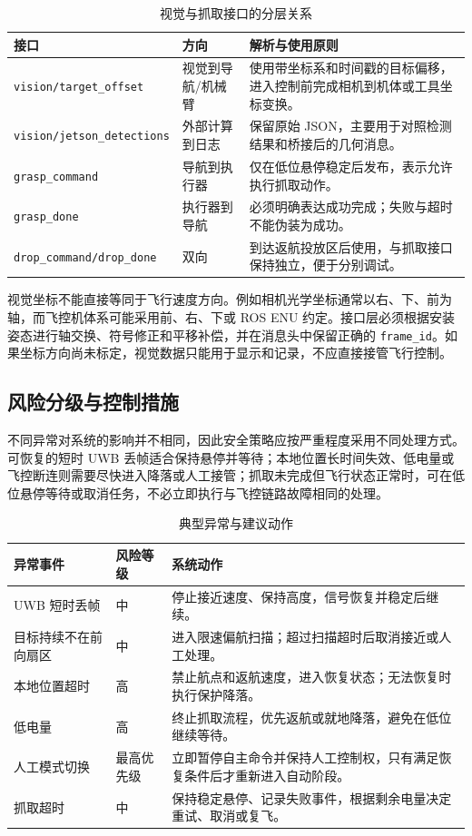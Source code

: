 \documentclass[12pt,a4paper]{ctexart}
\providecommand{\allowbreak}{\penalty0\relax}
\begin{document}
\begin{table}[htbp]
\centering
\caption{视觉与抓取接口的分层关系}\label{tab:vision-grasp}
{
\begin{tabular}{p{3.8cm}p{3.4cm}p{6.0cm}}
\hline
接口 & 方向 & 解析与使用原则 \\
\hline
\texttt{vision/}\allowbreak\texttt{target\_offset} & 视觉到导航/机械臂 & 使用带坐标系和时间戳的目标偏移，进入控制前完成相机到机体或工具坐标变换。\\
\texttt{vision/}\allowbreak\texttt{jetson\_detections} & 外部计算到日志 & 保留原始 JSON，主要用于对照检测结果和桥接后的几何消息。\\
\texttt{grasp\_command} & 导航到执行器 & 仅在低位悬停稳定后发布，表示允许执行抓取动作。\\
\texttt{grasp\_done} & 执行器到导航 & 必须明确表达成功完成；失败与超时不能伪装为成功。\\
\texttt{drop\_command/}\allowbreak\texttt{drop\_done} & 双向 & 到达返航投放区后使用，与抓取接口保持独立，便于分别调试。\\
\hline
\end{tabular}
}
\end{table}

视觉坐标不能直接等同于飞行速度方向。例如相机光学坐标通常以右、下、前为轴，而飞控机体系可能采用前、右、下或 ROS ENU 约定。接口层必须根据安装姿态进行轴交换、符号修正和平移补偿，并在消息头中保留正确的 \texttt{frame\_id}。如果坐标方向尚未标定，视觉数据只能用于显示和记录，不应直接接管飞行控制。

\subsection{风险分级与控制措施}
不同异常对系统的影响并不相同，因此安全策略应按严重程度采用不同处理方式。可恢复的短时 UWB 丢帧适合保持悬停并等待；本地位置长时间失效、低电量或飞控断连则需要尽快进入降落或人工接管；抓取未完成但飞行状态正常时，可在低位悬停等待或取消任务，不必立即执行与飞控链路故障相同的处理。

\begin{table}[htbp]
\centering
\caption{典型异常与建议动作}\label{tab:risk-actions}
{
\begin{tabular}{p{3.5cm}p{3.2cm}p{6.4cm}}
\hline
异常事件 & 风险等级 & 系统动作 \\
\hline
UWB 短时丢帧 & 中 & 停止接近速度、保持高度，信号恢复并稳定后继续。\\
目标持续不在前向扇区 & 中 & 进入限速偏航扫描；超过扫描超时后取消接近或人工处理。\\
本地位置超时 & 高 & 禁止航点和返航速度，进入恢复状态；无法恢复时执行保护降落。\\
低电量 & 高 & 终止抓取流程，优先返航或就地降落，避免在低位继续等待。\\
人工模式切换 & 最高优先级 & 立即暂停自主命令并保持人工控制权，只有满足恢复条件后才重新进入自动阶段。\\
抓取超时 & 中 & 保持稳定悬停、记录失败事件，根据剩余电量决定重试、取消或复飞。\\
\hline
\end{tabular}
}
\end{table}
\end{document}
